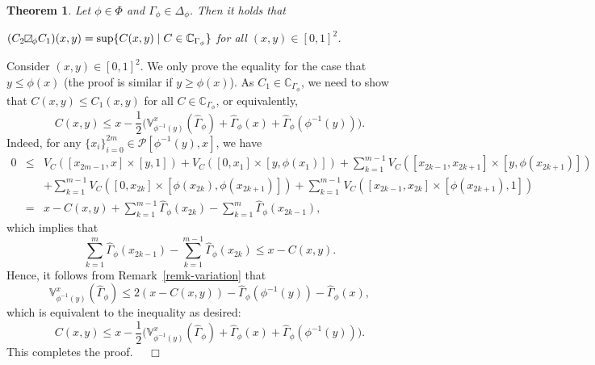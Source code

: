 \documentclass[12pt]{article}
\renewenvironment{proof}{\noindent{\bf Proof.}}{~~$\Box$}
\theoremstyle{plain}
\newtheorem{thrm}{Theorem}[section]
\theoremstyle{definition}
\newcommand{\MySs}{
\begin{tikzpicture}[baseline]
\draw (0,0em) -- (0em,0.6em) -- (0.6em,0.6em) -- (0.6em,0em) -- (0,0em);
\draw (0,0em) parabola (0.6em, 0.6em);
\end{tikzpicture}}
\begin{document}
\begin{thrm}
Let $\phi\in\Phi$ and $\Gamma_\phi\in\Delta_\phi$. Then it holds that

\centerline{$(C_2\MySs_\phi C_1)(x, y)=\sup\{C(x, y)\mid C\in\mathbb{C}_{\Gamma_\phi}\}$ for all $(x, y)\in[0, 1]^2$.}
\end{thrm}
\begin{proof}
Consider $(x, y)\in[0, 1]^2$. We only prove the equality for the case that $y\leq\phi(x)$ (the proof is similar if $y\geq\phi(x)$).
As $C_1\in\mathbb{C}_{\Gamma_\phi}$, we need to show that $C(x, y)\leq C_1(x, y)$ for all $C\in\mathbb{C}_{\Gamma_\phi}$, or equivalently,
\[C(x, y)\leq x-\frac{1}{2}\Big(\mathbb{V}^{x}_{\phi^{-1}(y)}(\hat{\Gamma}_{\phi})+\hat{\Gamma}_{\phi}(x)+\hat{\Gamma}_{\phi}(\phi^{-1}(y)) \Big).\]
Indeed, for any $\{x_i\}_{i=0}^{2m}\in\mathcal P[\phi^{-1}(y), x]$, we have
\begin{eqnarray*}
0
&\leq& V_C([x_{2m-1}, x]\times[y, 1])+V_C([0, x_1]\times[y, \phi(x_1)])+\sum^{m-1}_{k=1}V_C([x_{2k-1}, x_{2k+1}]\times[y, \phi(x_{2k+1})]) \\
&& +\sum^{m-1}_{k=1}V_C([0, x_{2k}]\times[\phi(x_{2k}), \phi(x_{2k+1})])+\sum^{m-1}_{k=1}V_C([x_{2k-1}, x_{2k}]\times[\phi(x_{2k+1}), 1])\\
&=& x-C(x, y)+\sum^{m-1}_{k=1}\hat{\Gamma}_\phi(x_{2k})-\sum^{m}_{k=1}\hat{\Gamma}_\phi(x_{2k-1}),
\end{eqnarray*}
which implies that
\[\sum^{m}_{k=1}\hat{\Gamma}_\phi(x_{2k-1})-\sum^{m-1}_{k=1}\hat{\Gamma}_\phi(x_{2k})\leq x-C(x, y).\]
Hence, it follows from Remark~\ref{remk-variation} that
\[\mathbb{V}_{\phi^{-1}(y)}^{x}(\hat{\Gamma}_\phi)\leq 2(x-C(x, y))-\hat{\Gamma}_\phi(\phi^{-1}(y))-\hat{\Gamma}_\phi(x),\]
which is equivalent to the inequality as desired:
\[C(x, y)\leq x-\frac{1}{2}\Big(\mathbb{V}^{x}_{\phi^{-1}(y)}(\hat{\Gamma}_{\phi})+\hat{\Gamma}_{\phi}(x)+\hat{\Gamma}_{\phi}(\phi^{-1}(y)) \Big).\]
This completes the proof.
\end{proof}
\end{document}
